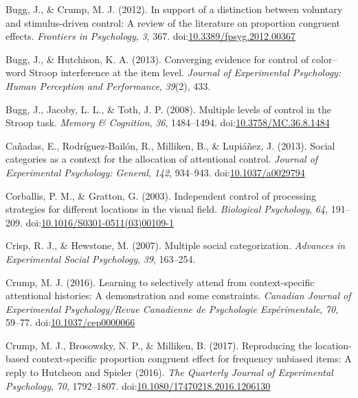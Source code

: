 \documentclass[english,,man,floatsintext]{apa6}
\begin{document}
\leavevmode\hypertarget{ref-bugg_support_2012}{}%
Bugg, J., \& Crump, M. J. (2012). In support of a distinction between voluntary and stimulus-driven control: A review of the literature on proportion congruent effects. \emph{Frontiers in Psychology}, \emph{3}, 367. doi:\href{https://doi.org/10.3389/fpsyg.2012.00367}{10.3389/fpsyg.2012.00367}

\leavevmode\hypertarget{ref-bugg_converging_2013}{}%
Bugg, J., \& Hutchison, K. A. (2013). Converging evidence for control of color--word Stroop interference at the item level. \emph{Journal of Experimental Psychology: Human Perception and Performance}, \emph{39}(2), 433.

\leavevmode\hypertarget{ref-bugg_multiple_2008}{}%
Bugg, J., Jacoby, L. L., \& Toth, J. P. (2008). Multiple levels of control in the Stroop task. \emph{Memory \& Cognition}, \emph{36}, 1484--1494. doi:\href{https://doi.org/10.3758/MC.36.8.1484}{10.3758/MC.36.8.1484}

\leavevmode\hypertarget{ref-canadas_social_2013}{}%
Cañadas, E., Rodríguez-Bailón, R., Milliken, B., \& Lupiáñez, J. (2013). Social categories as a context for the allocation of attentional control. \emph{Journal of Experimental Psychology: General}, \emph{142}, 934--943. doi:\href{https://doi.org/10.1037/a0029794}{10.1037/a0029794}

\leavevmode\hypertarget{ref-corballis_independent_2003}{}%
Corballis, P. M., \& Gratton, G. (2003). Independent control of processing strategies for different locations in the visual field. \emph{Biological Psychology}, \emph{64}, 191--209. doi:\href{https://doi.org/10.1016/S0301-0511(03)00109-1}{10.1016/S0301-0511(03)00109-1}

\leavevmode\hypertarget{ref-crisp_multiple_2007}{}%
Crisp, R. J., \& Hewstone, M. (2007). Multiple social categorization. \emph{Advances in Experimental Social Psychology}, \emph{39}, 163--254.

\leavevmode\hypertarget{ref-crump_learning_2016}{}%
Crump, M. J. (2016). Learning to selectively attend from context-specific attentional histories: A demonstration and some constraints. \emph{Canadian Journal of Experimental Psychology/Revue Canadienne de Psychologie Expérimentale}, \emph{70}, 59--77. doi:\href{https://doi.org/10.1037/cep0000066}{10.1037/cep0000066}

\leavevmode\hypertarget{ref-crump_reproducing_2017}{}%
Crump, M. J., Brosowsky, N. P., \& Milliken, B. (2017). Reproducing the location-based context-specific proportion congruent effect for frequency unbiased items: A reply to Hutcheon and Spieler (2016). \emph{The Quarterly Journal of Experimental Psychology}, \emph{70}, 1792--1807. doi:\href{https://doi.org/10.1080/17470218.2016.1206130}{10.1080/17470218.2016.1206130}
\end{document}
